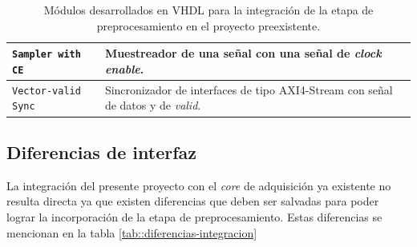 \documentclass[../../main.tex]{subfiles}
\begin{document}
\begin{table}[H]
{\begin{tabular}{|ll|}
    \multicolumn{1}{|l|}{\texttt{Sampler with CE}}       &
    Muestreador de una señal con una señal de \textit{clock enable}.


    \\ \hline
    
    \multicolumn{1}{|l|}{\texttt{Vector-valid Sync}}       &
    Sincronizador de interfaces de tipo AXI4-Stream con señal de datos y de \textit{valid}.


                                                                                         \\ \hline
    \end{tabular}%
    }
    \caption{Módulos desarrollados en VHDL para la integración de la etapa de preprocesamiento en el proyecto preexistente.}
    \label{tab::ip-fran-integracion}
    \end{table}

\subsection{Diferencias de interfaz}
La integración del presente proyecto con el \textit{core} de adquisición ya existente no resulta directa ya que existen diferencias que deben ser salvadas para poder lograr la incorporación de la etapa de preprocesamiento. Estas diferencias se mencionan en la tabla \ref{tab::diferencias-integracion}

\end{document}
